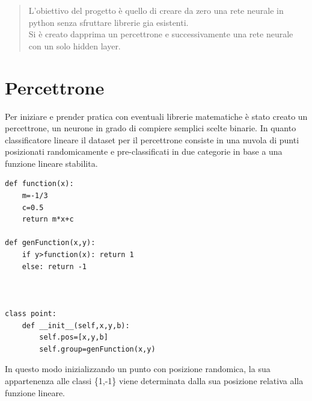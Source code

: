 \documentclass[12pt]{article}
\begin{document}
\begin{titlepage}
\end{titlepage}
\begin{abstract}
L'obiettivo del progetto è quello di creare da zero una rete neurale in python senza sfruttare librerie gia esistenti.
\\Si è creato dapprima un percettrone e successivamente una rete neurale con un solo hidden layer.
\end{abstract}
\section{Percettrone}
Per iniziare e prender pratica con eventuali librerie matematiche è stato creato un percettrone, un neurone in grado di compiere semplici scelte binarie.
In quanto classificatore lineare il dataset per il percettrone consiste in una nuvola di punti posizionati randomicamente e pre-classificati in due categorie in base a una funzione lineare stabilita.
\begin{lstlisting}
def function(x):
	m=-1/3
	c=0.5
	return m*x+c

def genFunction(x,y):
	if y>function(x): return 1
	else: return -1



class point:
    def __init__(self,x,y,b):
		self.pos=[x,y,b]
		self.group=genFunction(x,y)

\end{lstlisting}
In questo modo inizializzando un punto con posizione randomica, la sua appartenenza alle classi \{1,-1\} viene determinata dalla sua posizione relativa alla funzione lineare.
\end{document}
